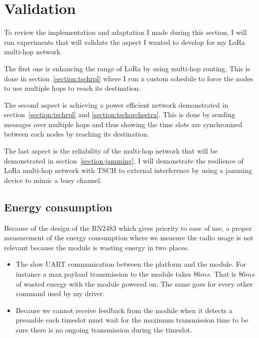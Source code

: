 \section{Validation\label{section:tschtesting}}

To review the implementation and adaptation I made during this section, I will
run experiments that will validate the aspect I wanted to develop for my
LoRa multi-hop network.

The first one is enhancing the range of LoRa by using multi-hop routing.
This is done in section~\ref{section:tschrpl} where I run a custom schedule
to force the nodes to use multiple hops to reach its destination.

The second aspect is achieving a power efficient network demonstrated in
section~\ref{section:tschrpl} and \ref{section:tschorchestra}.
This is done by sending messages over multiple hops and thus showing the time
slots are synchronized between each nodes by reaching its destination.

The last aspect is the reliability of the multi-hop network that will be
demonstrated in section~\ref{section:jamming}. I will demonstrate the resilience
of LoRa multi-hop network with TSCH to external interference by using a jamming
device to mimic a busy channel.

\subsection{Energy consumption\label{section:energyconsumption}}

Because of the design of the RN2483 which gives priority to ease of use,
a proper measurement of the energy consumption where we measure the radio
usage is not relevant because the module is wasting energy in two places.

\begin{itemize}
  \item The slow UART communication between the platform and the module. For
    instance a max payload transmission to the module takes $86 ms$.
    That is $86 ms$ of wasted energy with the module powered on. The same goes
    for every other command used by my driver.
  \item Because we cannot receive feedback from the module when it detects a
    preamble each timeslot must wait for the maximum transmission time to be
    sure there is no ongoing transmission during the timeslot.
\end{itemize}

